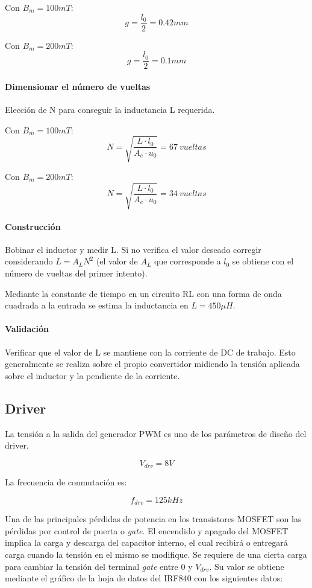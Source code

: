 Con $B_m=100mT$:
$$ g=\frac{l_0}{2}=0.42mm $$

Con $B_m=200mT$:
$$ g=\frac{l_0}{2}=0.1mm $$

\paragraph{Dimensionar el número de vueltas}

Elección de N para conseguir la inductancia L requerida.

Con $B_m=100mT$:
$$ N=\sqrt{\frac{L\cdot l_0}{A_e\cdot u_0}}=67\ vueltas$$

Con $B_m=200mT$:
$$ N=\sqrt{\frac{L\cdot l_0}{A_e\cdot u_0}}=34\ vueltas $$

\paragraph{Construcción}

Bobinar el inductor y medir L. Si no verifica el valor deseado corregir
considerando $L = A_LN^2$ (el valor de $A_L$ que corresponde a $l_0$ se obtiene con
el número de vueltas del primer intento).

Mediante la constante de tiempo en un circuito RL con una forma de onda cuadrada a la entrada se estima la inductancia en $L=450\mu H$. 

\paragraph{Validación}

Verificar que el valor de L se mantiene con la corriente de DC de trabajo.
Esto generalmente se realiza sobre el propio convertidor midiendo la
tensión aplicada sobre el inductor y la pendiente de la corriente.

\subsection{Driver}

La tensión a la salida del generador PWM es uno de los parámetros de diseño del driver.

$$ V_{drv}=8V $$

La frecuencia de conmutación es: 

$$ f_{drv}=125kHz $$


Una de las principales pérdidas de potencia en los transistores MOSFET son las pérdidas por control de puerta o \textit{gate}. 
El encendido y apagado del MOSFET implica la carga y descarga del capacitor interno, 
el cual recibirá o entregará carga cuando la tensión en el mismo se modifique. 
Se requiere de una cierta carga para cambiar la tensión del terminal \textit{gate} entre $0$ y $V_{drv}$. 
Su valor se obtiene mediante el gráfico de la hoja de datos del IRF840 con los siguientes datos:

